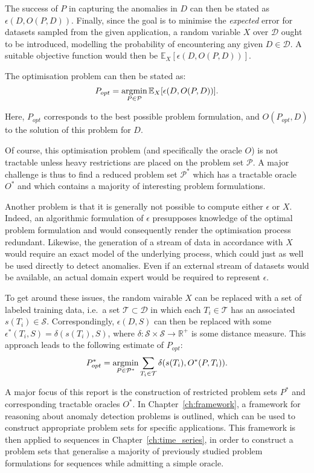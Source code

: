 The success of $P$ in capturing the anomalies in $D$ can then be stated as $\epsilon(D, O(P, D))$. Finally, since the goal is to minimise the \emph{expected} error for datasets sampled from the given application, a random variable $X$ over $\mathcal{D}$ ought to be introduced, modelling the probability of encountering any given $D \in \mathcal{D}$. A suitable objective function would then be $\mathbb{E}_X [\epsilon(D, O(P, D))]$.

The optimisation problem can then be stated as:
\[
    P_{opt} = \argmin_{P \in \mathcal{P}}\mathbb{E}_X [ \epsilon(D, O(P, D)) ].
\]

Here, $P_{opt}$ corresponds to the best possible problem formulation, and $O(P_{opt}, D)$ to the solution of this problem for $D$.

Of course, this optimisation problem (and specifically the oracle $O$) is not tractable unless heavy restrictions are placed on the problem set $\mathcal{P}$. A major challenge is thus to find a reduced problem set $\mathcal{P}^*$ which has a tractable oracle $O^*$ and which contains a majority of interesting problem formulations.

Another problem is that it is generally not possible to compute either $\epsilon$ or $X$. Indeed, an algorithmic formulation of $\epsilon$ presupposes knowledge of the optimal problem formulation and would consequently render the optimisation process redundant. Likewise, the generation of a stream of data in accordance with $X$ would require an exact model of the underlying process, which could just as well be used directly to detect anomalies. Even if an external stream of datasets would be available, an actual domain expert would be required to represent $\epsilon$.

To get around these issues, the random vairable $X$ can be replaced with a set of labeled training data, i.e.\ a set $\mathcal{T} \subset \mathcal{D}$ in which each $T_i \in \mathcal{T}$ has an associated $s(T_i) \in \mathcal{S}$.
Correspondingly, $\epsilon(D, S)$ can then be replaced with some $\epsilon^*(T_i, S) = \delta(s(T_i), S)$, where $\delta: \mathcal{S} \times \mathcal{S} \rightarrow \mathbb{R}^+$ is some distance measure.
This approach leads to the following estimate of $P_{opt}$:
\[
    P^*_{opt} = \argmin_{P \in \mathcal{P}^*} \sum_{T_i \in \mathcal{T}} \delta(s(T_i), O^*(P, T_i)).
\]

A major focus of this report is the construction of restricted problem sets $P^*$ and corresponding tractable oracles $O^*$. In Chapter~\ref{ch:framework}, a framework for reasoning about anomaly detection problems is outlined, which can be used to construct appropriate problem sets for specific applications. This framework is then applied to sequences in Chapter~\ref{ch:time_series}, in order to construct a problem sets that generalise a majority of previously studied problem formulations for sequences while admitting a simple oracle.
